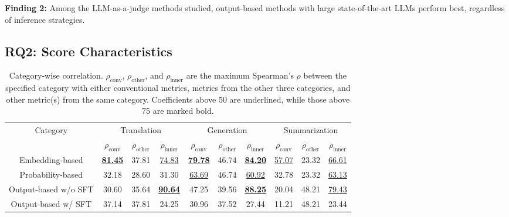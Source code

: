 \vspace*{6pt}
\begin{leftbar}
\textbf{Finding 2:} Among the LLM-as-a-judge methods studied, output-based methods with large state-of-the-art LLMs perform best, regardless of inference strategies.
\end{leftbar}
\vspace*{6pt}

\subsection{RQ2: Score Characteristics}
\begin{table}[]
    \centering
    \caption{Category-wise correlation. \(\rho_\text{conv}\), \(\rho_\text{other}\), and \(\rho_\text{inner}\) are the maximum Spearman's \(\rho\) between the specified category with either conventional metrics, metrics from the other three categories, and other metric(s) from the same category. Coefficients above 50 are underlined, while those above 75 are marked bold.}
    \vspace{-1.0em}
    \begin{tabular}{c|ccc|ccc|ccc}
          \toprule
         \multirow{2}{*}{Category} & \multicolumn{3}{c|}{Translation} & \multicolumn{3}{c|}{Generation} & \multicolumn{3}{c}{Summarization} \\

         & \(\rho_\text{conv}\) & \(\rho_\text{other}\) & \(\rho_\text{inner}\) & \(\rho_\text{conv}\) & \(\rho_\text{other}\) & \(\rho_\text{inner}\) & \(\rho_\text{conv}\) & \(\rho_\text{other}\) & \(\rho_\text{inner}\) \\ \midrule

Embedding-based & \underline{\textbf{81.45}} & 37.81 & \underline{74.83} & \underline{\textbf{79.78}} & 46.74 & \underline{\textbf{84.20}} & \underline{57.07} & 23.32 & \underline{66.61} \\
Probability-based & 32.18 & 28.60 & 31.30 & \underline{63.69} & 46.74 & \underline{60.92} & 32.78 & 23.32 & \underline{63.13} \\
Output-based w/o SFT & 30.60 & 35.64 & \underline{\textbf{90.64}} & 47.25 & 39.56 & \underline{\textbf{88.25}} & 20.04 & 48.21 & \underline{79.43} \\ 
Output-based w/ SFT &  37.14 &  37.81 & 24.25 &  30.96 &  37.52 & 27.44 &  11.21 &  48.21 & 23.44 \\ \bottomrule

    \end{tabular}
    \label{tab:RQ2_res}
    \vspace{-0.5em}
\end{table}

